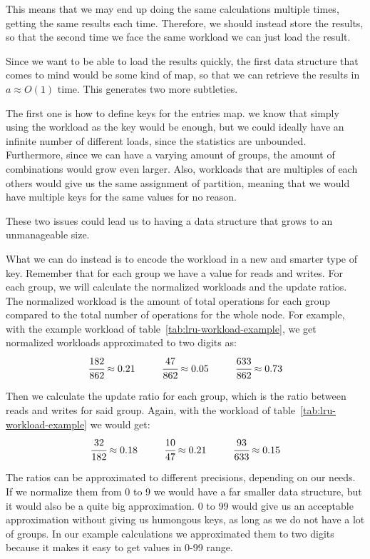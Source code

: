 This means that we may end up doing the same calculations multiple times, getting the same results each time. Therefore, we should instead store the results, so that the second time we face the same workload we can just load the result. 

Since we want to be able to load the results quickly, the first data structure that comes to mind would be some kind of map, so that we can retrieve the results in $a\approx O(1)$ time. This generates two more subtleties.

The first one is how to define keys for the entries map. we know that simply using the workload as the key would be enough, but we could ideally have an infinite number of different loads, since the statistics are unbounded. Furthermore, since we can have a varying amount of groups, the amount of combinations would grow even larger. Also, workloads that are multiples of each others would give us the same assignment of partition, meaning that we would have multiple keys for the same values for no reason.

These two issues could lead us to having a data structure that grows to an unmanageable size.

What we can do instead is to encode the workload in a new and smarter type of key. Remember that for each group we have a value for reads and writes. For each group, we will calculate the normalized workloads and the update ratios. The normalized workload is the amount of total operations for each group compared to the total number of operations for the whole node. For example, with the example workload of table~\ref{tab:lru-workload-example}, we get normalized workloads approximated to two digits as: 
$$ \cfrac{182}{862} \approx 0.21\ \ \ \ \ \ \ \ \cfrac{47}{862} \approx 0.05\ \ \ \ \ \ \ \ \cfrac{633}{862} \approx 0.73$$

Then we calculate the update ratio for each group, which is the ratio between reads and writes for said group. Again, with the workload of table~\ref{tab:lru-workload-example} we would get:
$$ \cfrac{32}{182} \approx 0.18\ \ \ \ \ \ \ \ \cfrac{10}{47} \approx 0.21\ \ \ \ \ \ \ \ \cfrac{93}{633} \approx 0.15$$

The ratios can be approximated to different precisions, depending on our needs. If we normalize them from 0 to 9 we would have a far smaller data structure, but it would also be a quite big approximation. 0 to 99 would give us an acceptable approximation without giving us humongous keys, as long as we do not have a lot of groups. In our example calculations we approximated them to two digits because it makes it easy to get values in 0-99 range.

